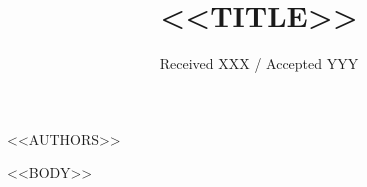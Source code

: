 \documentclass[longauth]{aa}
\begin{document}
\title{<<TITLE>>}

<<AUTHORS>>

\date{Received XXX / Accepted YYY}



\maketitle

<<BODY>>



\end{document}
